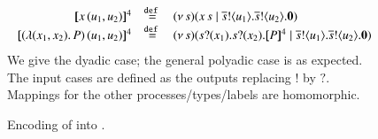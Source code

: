 \begin{figure}[t]
\[\begin{array}{rcl}
	\map{\appl{x}{(u_1, u_2)}}^{4} &\defeq& \newsp{s}{\appl{x}{s} \Par \bout{\dual{s}}{u_1}   \bout{\dual{s}}{u_2} \inact}
	\\
	\map{\appl{(\abs{(x_1,x_2)}{P})}{(u_1, u_2)}}^{4} &\defeq&
	\newsp{s}{\binp{s}{x_1}  \binp{s}{x_2} \pmap{P}{4} \Par \bout{\dual{s}}{u_1}  \bout{\dual{s}}{u_2} \inact} 
\end{array}
\]
We give the dyadic case;
the general polyadic case is as expected.
The input cases are defined as the outputs replacing $!$ by $?$. 
Mappings for the other processes/types/labels are 
homomorphic.

\caption{\label{f:enc:poltomon}Encoding of \PHOp into \HOp. }
\end{figure}

